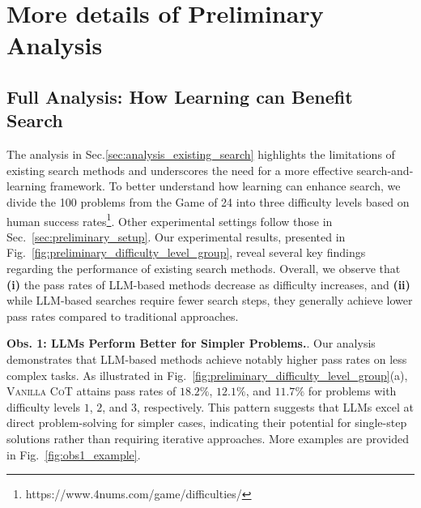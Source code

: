 \section{More details of Preliminary Analysis}
\label{appendix:section_title_more_details_of_preliminary_analysis}

\subsection{Full Analysis: How Learning can Benefit Search}
\label{appendix:preliminary_results_analysis_appendix}
The analysis in Sec.\ref{sec:analysis_existing_search} highlights the limitations of existing search methods and underscores the need for a more effective search-and-learning framework. To better understand how learning can enhance search, we divide the 100 problems from the Game of 24 into three difficulty levels based on human success rates\footnote{{https://www.4nums.com/game/difficulties/}}. Other experimental settings follow those in Sec.~\ref{sec:preliminary_setup}.
Our experimental results, presented in Fig.~\ref{fig:preliminary_difficulty_level_group}, reveal several key findings regarding the performance of existing search methods. Overall, we observe that \textbf{(i)} the pass rates of LLM-based methods decrease as difficulty increases, and \textbf{(ii)} while LLM-based searches require fewer search steps, they generally achieve lower pass rates compared to traditional approaches.

\noindent \textbf{Obs. 1: LLMs Perform Better for Simpler Problems.}. Our analysis demonstrates that LLM-based methods achieve notably higher pass rates on less complex tasks. As illustrated in Fig.~\ref{fig:preliminary_difficulty_level_group}(a), \textsc{Vanilla CoT} attains pass rates of $\num{18.2}\%$, $\num{12.1}\%$, and $\num{11.7}\%$ for problems with difficulty levels $1$, $2$, and $3$, respectively. This pattern suggests that LLMs excel at direct problem-solving for simpler cases, indicating their potential for single-step solutions rather than requiring iterative approaches. More examples are provided in Fig.~\ref{fig:obs1_example}.

